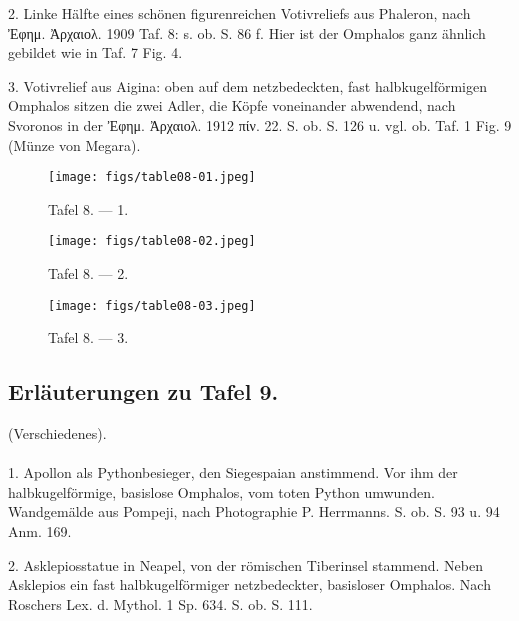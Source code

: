 \documentclass[a4paper, 11pt, oneside]{article}
\begin{document}
2. Linke Hälfte eines schönen figurenreichen Votivreliefs aus Phaleron, nach Ἐφημ. Ἀρχαιολ. 1909 Taf. 8: s. ob. S. 86 f. Hier ist der Omphalos ganz ähnlich gebildet wie in Taf. 7 Fig. 4.

3. Votivrelief aus Aigina: oben auf dem netzbedeckten, fast halbkugelförmigen Omphalos sitzen die zwei Adler, die Köpfe voneinander abwendend, nach Svoronos in der Ἐφημ. Ἀρχαιολ. 1912 πίν. 22. S. ob. S. 126 u. vgl. ob. Taf. 1 Fig. 9 (Münze von Megara).
\clearpage
\clearpage
\vspace*{\fill}
\begin{figure}[H]
\centering
\texttt{[image: figs/table08-01.jpeg]}
\caption{\frakfamily Tafel 8. --- 1.}
\end{figure}
\vspace*{\fill}
\clearpage
\vspace*{\fill}
\begin{figure}[H]
\centering
\texttt{[image: figs/table08-02.jpeg]}
\caption{\frakfamily Tafel 8. --- 2.}
\end{figure}
\vspace*{\fill}
\clearpage
\vspace*{\fill}
\begin{figure}[H]
\centering
\texttt{[image: figs/table08-03.jpeg]}
\caption{\frakfamily Tafel 8. --- 3.}
\end{figure}
\vspace*{\fill}
\clearpage

\subsection{Erläuterungen zu Tafel 9.}
\begin{center}
(Verschiedenes).
\end{center}
\paragraph{}
1. Apollon als Pythonbesieger, den Siegespaian anstimmend. Vor ihm der halbkugelförmige, basislose Omphalos, vom toten Python umwunden. Wandgemälde aus Pompeji, nach Photographie P. Herrmanns. S. ob. S. 93 u. 94 Anm. 169.

2. Asklepiosstatue in Neapel, von der römischen Tiberinsel stammend. Neben Asklepios ein fast halbkugelförmiger netzbedeckter, basisloser Omphalos. Nach Roschers Lex. d. Mythol. 1 Sp. 634. S. ob. S. 111.
\end{document}

